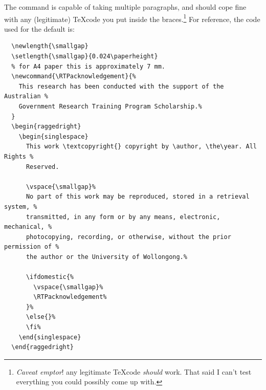 \documentclass[12pt,oneside]{article}
\begin{document}
\begin{description}
    The command is capable of taking multiple paragraphs, and should cope fine with any (legitimate) \TeX code you put inside the braces.\footnote{\emph{Caveat emptor}! any legitimate \TeX code \emph{should} work. That said I can't test everything you could possibly come up with.} For reference, the code used for the default is:
\begin{lstlisting}
  \newlength{\smallgap}
  \setlength{\smallgap}{0.024\paperheight}
  % for A4 paper this is approximately 7 mm.
  \newcommand{\RTPacknowledgement}{%
    This research has been conducted with the support of the Australian %
    Government Research Training Program Scholarship.%
  }
  \begin{raggedright}
    \begin{singlespace}
      This work \textcopyright{} copyright by \author, \the\year. All Rights %
      Reserved.
  
      \vspace{\smallgap}%
      No part of this work may be reproduced, stored in a retrieval system, %
      transmitted, in any form or by any means, electronic, mechanical, %
      photocopying, recording, or otherwise, without the prior permission of %
      the author or the University of Wollongong.%
  
      \ifdomestic{%
        \vspace{\smallgap}%
        \RTPacknowledgement%
      }%
      \else{}%
      \fi%
    \end{singlespace}
  \end{raggedright}
\end{lstlisting}

\end{description}
\end{document}
